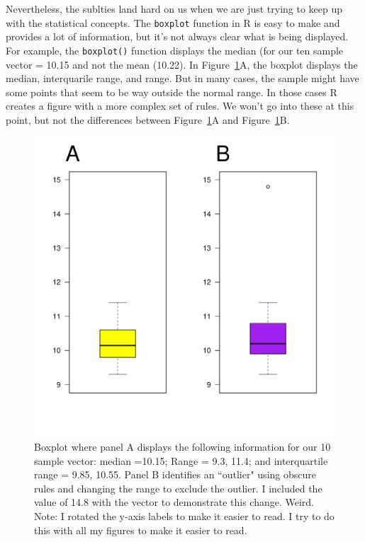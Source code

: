 \documentclass{tufte-handout}\usepackage[]{graphicx}\usepackage[]{color}
\makeatletter
\def\maxwidth{ %
  \ifdim\Gin@nat@width>\linewidth
    \linewidth
  \else
    \Gin@nat@width
  \fi
}
\newenvironment{knitrout}{}{} %
\makeatother
\begin{document}
Nevertheless, the sublties land hard on us when we are just trying to keep up with the statistical concepts. The \texttt{boxplot} function in R is easy to make and provides a lot of information, but it's not always clear what is being displayed. For example, the \texttt{boxplot()} function displays the median (for our ten sample vector = 10.15 and not the mean (10.22). In Figure~\ref{fig:default_bp}A, the boxplot displays the median, interquarile range, and range. But in many cases, the sample might have some points that seem to be way outside the normal range. In those cases R creates a figure with a more complex set of rules. We won't go into these at this point, but not the differences between Figure~\ref{fig:default_bp}A and Figure~\ref{fig:default_bp}B. 

\begin{figure}
\caption{Boxplot where panel A displays the following information for our 10 sample vector: median =10.15; Range = 9.3, 11.4; and interquartile range = 9.85, 10.55. Panel B identifies an ``outlier" using obscure rules and changing the range to exclude the outlier. I included the value of 14.8 with the vector to demonstrate this change. Weird. Note: I rotated the y-axis labels to make it easier to read. I try to do this with all my figures to make it easier to read.}
\label{fig:default_bp}
\begin{knitrout}
\color{fgcolor}
\includegraphics[width=\maxwidth]{figure/unnamed-chunk-6-1} 

\end{knitrout}
\end{figure}
\end{document}
